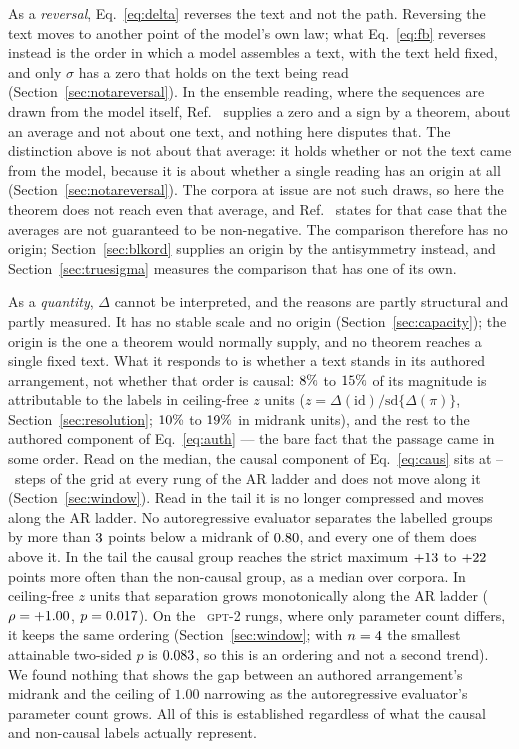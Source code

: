 \documentclass[11pt]{article}
\begin{document}
As a \emph{reversal}, Eq.~\eqref{eq:delta} reverses the text and not the
path.  Reversing the text moves to another point of the model's own law;
what Eq.~\eqref{eq:fb} reverses instead is the order in which a model
assembles a text, with the text held fixed, and only $\sigma$ has a zero
that holds on the text being read (Section~\ref{sec:notareversal}).  In the
ensemble reading, where the sequences are drawn from the model itself,
Ref.~\cite{sagawa2026} supplies a zero and a sign by a theorem, about an
average and not about one text, and nothing here disputes that.  The distinction above is not about
that average: it holds whether or not the text came from the model, because
it is about whether a single reading has an origin at all
(Section~\ref{sec:notareversal}).  The corpora at issue are not such draws,
so here the theorem does not reach even that average, and
Ref.~\cite{sagawa2026} states for that case that the averages are not
guaranteed to be non-negative.  The
comparison therefore has no origin; Section~\ref{sec:blkord} supplies an
origin by the antisymmetry instead, and
Section~\ref{sec:truesigma} measures the comparison that has one of its
own.

As a \emph{quantity}, $\Delta$ cannot be interpreted, and the reasons are
partly structural and partly measured.  It has no stable scale and no
origin
(Section~\ref{sec:capacity}); the origin is the one a theorem would normally
supply, and no theorem reaches a single fixed text.  What it responds to is
whether a text stands in its authored arrangement, not whether that order is
causal: $8\%$ to $15\%$ of its magnitude is attributable
to the labels in ceiling-free $z$ units
($z = \Delta(\mathrm{id})/\mathrm{sd}\{\Delta(\pi)\}$,
Section~\ref{sec:resolution}; $10\%$ to
$19\%$ in midrank units), and the rest to the authored component
of Eq.~\eqref{eq:auth} --- the bare fact that the passage came in some
order.  Read on the median, the causal component of Eq.~\eqref{eq:caus}
sits at \CausalCompStepsMin--\CausalCompStepsMax\ steps of the grid at
every rung of the AR ladder and does not move along it
(Section~\ref{sec:window}).  Read in the tail it is no longer compressed
and moves along the AR ladder.  No autoregressive evaluator
separates the labelled groups by more than
$3$ points below a midrank of $0.80$, and every
one of them does above it.
In the tail the causal group reaches the strict maximum
$+13$ to $+22$ points more often than the non-causal
group, as a median over corpora.  In
ceiling-free $z$ units that separation grows monotonically along the AR ladder
($\rho = +1.00$, $p = 0.017$).  On the
\TailZFamNEval\ \textsc{gpt-2} rungs, where only parameter count differs, it
keeps the same ordering (Section~\ref{sec:window}; with $n = 4$
the smallest attainable two-sided $p$ is $0.083$, so this is an
ordering and not a second trend).  We found nothing that shows the gap between an authored arrangement's
midrank and the ceiling of $1.00$ narrowing as the autoregressive
evaluator's parameter count grows.  All of this is established regardless of what the causal and non-causal
labels actually represent.
\end{document}
